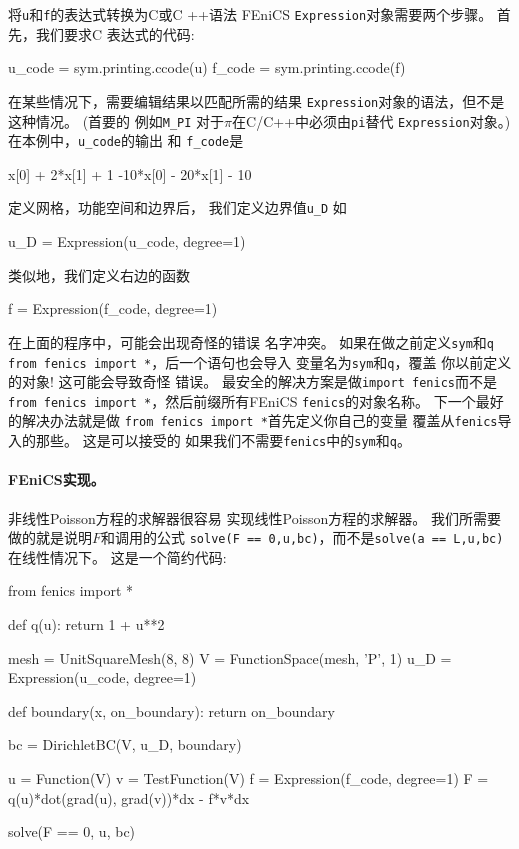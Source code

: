 将\texttt{u}和\texttt{f}的表达式转换为C或C ++语法
FEniCS \texttt{Expression}对象需要两个步骤。 首先，我们要求C
表达式的代码:

\begin{python}
u_code = sym.printing.ccode(u)
f_code = sym.printing.ccode(f)
\end{python}
在某些情况下，需要编辑结果以匹配所需的结果
\texttt{Expression}对象的语法，但不是这种情况。 (首要的
例如\verb!M_PI! 对于$\pi$在C/C++中必须由\texttt{pi}替代
\texttt{Expression}对象。)在本例中，\verb!u_code!的输出 和
\verb!f_code!是

\begin{c}
x[0] + 2*x[1] + 1
-10*x[0] - 20*x[1] - 10
\end{c}
定义网格，功能空间和边界后，
我们定义边界值\verb!u_D! 如

\begin{python}
u_D = Expression(u_code, degree=1)
\end{python}
类似地，我们定义右边的函数

\begin{python}
f = Expression(f_code, degree=1)
\end{python}

\begin{notice}[命名FEniCS与程序变量之间的冲突]
在上面的程序中，可能会出现奇怪的错误
名字冲突。 如果在做之前定义\texttt{sym}和\texttt{q}
\texttt{from fenics import *}，后一个语句也会导入
变量名为\texttt{sym}和\texttt{q}，覆盖
你以前定义的对象! 这可能会导致奇怪
错误。 最安全的解决方案是做\texttt{import fenics}而不是
\texttt{from fenics import *}，然后前缀所有FEniCS
\texttt{fenics}的对象名称。 下一个最好的解决办法就是做
\texttt{from fenics import *}首先定义你自己的变量
覆盖从\texttt{fenics}导入的那些。 这是可以接受的
如果我们不需要\texttt{fenics}中的\texttt{sym}和\texttt{q}。
\end{notice}

\paragraph{FEniCS实现。}
非线性Poisson方程的求解器很容易
实现线性Poisson方程的求解器。
我们所需要做的就是说明$F$和调用的公式
\texttt{solve(F == 0,u,bc)}，而不是\texttt{solve(a == L,u,bc)}
在线性情况下。 这是一个简约代码:

\begin{python}
from fenics import *

def q(u):
    return 1 + u**2

mesh = UnitSquareMesh(8, 8)
V = FunctionSpace(mesh, 'P', 1)
u_D = Expression(u_code, degree=1)

def boundary(x, on_boundary):
    return on_boundary

bc = DirichletBC(V, u_D, boundary)

u = Function(V)
v = TestFunction(V)
f = Expression(f_code, degree=1)
F = q(u)*dot(grad(u), grad(v))*dx - f*v*dx

solve(F == 0, u, bc)
\end{python}


